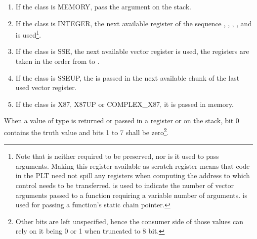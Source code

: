 \begin{enumerate}
\item If the class is MEMORY, pass the argument on the stack.

\item If the class is INTEGER, the next available register of the
  sequence \RDI, \RSI, \RDX, \RCX,  and  is
  used\footnote{Note that  is neither required to be
    preserved, nor is it used to pass arguments.  Making this register
    available as scratch register means that code in the PLT need not
    spill any registers when computing the address to which control
    needs to be transferred.  \RAX is used to indicate the number of
    vector arguments passed to a function requiring a variable number of
    arguments.  is used for passing a function's static chain
    pointer.}.

\item If the class is SSE, the next available vector register is used, the
   registers are taken in the order from  to .

\item If the class is SSEUP, the \eightbyte is passed in the next
   available \eightbyte chunk of the last used vector register.

\item If the class is X87, X87UP or COMPLEX\_X87, it is passed in memory.
\end{enumerate}

When a value of type  is returned or passed in a register or
on the stack, bit 0 contains the truth value and bits 1 to 7 shall be
zero\footnote{Other bits are left unspecified, hence the consumer
side of those values can rely on it being 0 or 1 when truncated to 8
bit.}.

